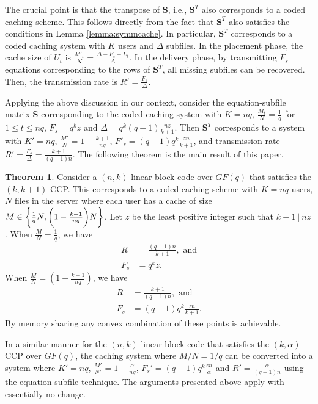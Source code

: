 \documentclass[journal,twocolumn]{IEEEtran}
\theoremstyle{definition}
\newtheorem{theorem}{Theorem}
\newcommand{\bfS}{\mathbf{S}}
\begin{document}
The crucial point is that the transpose of $\bfS$, i.e., $\bfS^T$ also corresponds to a coded caching scheme. This follows directly from the fact that $\bfS^T$ also satisfies the conditions in Lemma \ref{lemma:symmcache}. In particular, $\bfS^T$ corresponds to a coded caching system with $K$ users and $\Delta$ subfiles. In the placement phase, the cache size of $U_t$ is $\frac{M'_t}{N}=\frac{\Delta-F_s+L_t}{\Delta}$. In the delivery phase, by transmitting $F_s$ equations corresponding to the rows of $\bfS^T$, all missing subfiles can be recovered. Then, the transmission rate is $R'=\frac{F_s}{\Delta}$.

Applying the above discussion in our context, consider the equation-subfile matrix $\bfS$ corresponding to the coded caching system with $K=nq$, $\frac{M_t}{N}=\frac{1}{q}$ for $1\le t\le nq$, $F_s=q^kz$ and $\Delta= q^k(q-1)\frac{nz}{k+1}$. Then $\bfS^T$ corresponds to a system with $K'=nq$, $\frac{M'}{N}=1-\frac{k+1}{nq}$, $F'_s=(q-1)q^k\frac{zn}{k+1}$, and transmission rate $R'=\frac{F_s}{\Delta}=\frac{k+1}{(q-1)n}$. The following theorem is the main result of this paper.
\begin{theorem}
	\label{them:main}
	Consider a $(n,k)$ linear block code over $GF(q)$ that satisfies the $(k,k+1)$ CCP. This corresponds to a coded caching scheme with $K=nq$ users, $N$ files in the server where each user has a cache of size $M \in \bigg{\{} \frac{1}{q}N,\bigg{(}1-\frac{k+1}{nq}\bigg{)}N \bigg{\}}$. Let $z$ be the least positive integer such that $k+1~|~nz$. When $\frac{M}{N}=\frac{1}{q}$, we have
	\begin{align*}
		R&=\frac{(q-1)n}{k+1}, \text{~and}\\
		F_s&=q^kz.
	\end{align*}
	When $\frac{M}{N}=(1-\frac{k+1}{nq})$, we have
	\begin{align*}
		R&=\frac{k+1}{(q-1)n}, \text{~and}\\
		F_s&=(q-1)q^k\frac{zn}{k+1}.
	\end{align*}
By memory sharing any convex combination of these points is achievable.
\end{theorem}


In a similar manner for the $(n,k)$ linear block code that satisfies the $(k,\alpha)$-CCP over $GF(q)$, the caching system where $M/N=1/q$ can be converted into a system where $K'=nq$, $\frac{M'}{N'}=1-\frac{\alpha}{nq}$, $F_s'=(q-1)q^k\frac{zn}{\alpha}$ and $R'=\frac{\alpha}{(q-1)n}$ using the equation-subfile technique. The arguments presented above apply with essentially no change.
\end{document}
